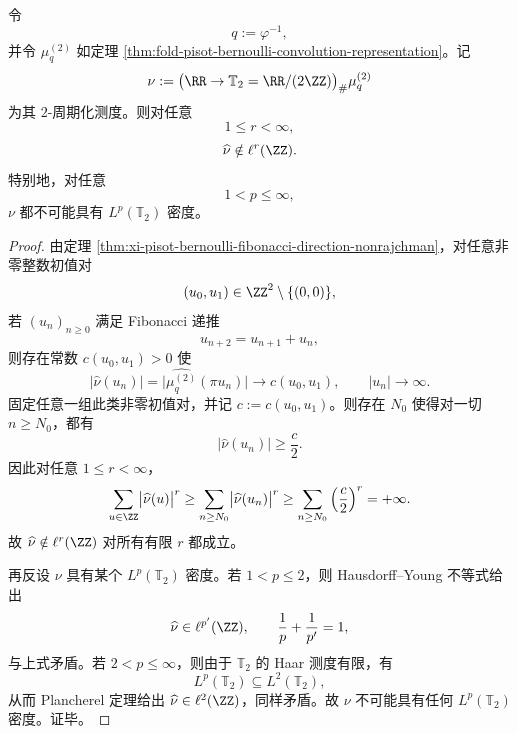 \begin{theorem}\label{thm:xi-bernoulli-two-periodization-no-lp-density}
令
\[
q:=\varphi^{-1},
\]
并令 \(\mu_q^{(2)}\) 如定理 \ref{thm:fold-pisot-bernoulli-convolution-representation}。记
\[
\nu:=\bigl(\RR\to \mathbb T_2=\RR/(2\ZZ)\bigr)_\#\mu_q^{(2)}
\]
为其 \(2\)-周期化测度。则对任意
\[
1\le r<\infty,
\]
\[
\widehat\nu\notin \ell^r(\ZZ).
\]
特别地，对任意
\[
1<p\le\infty,
\]
\(\nu\) 都不可能具有 \(L^p(\mathbb T_2)\) 密度。
\end{theorem}
\begin{proof}
由定理 \ref{thm:xi-pisot-bernoulli-fibonacci-direction-nonrajchman}，对任意非零整数初值对
\[
(u_0,u_1)\in\ZZ^2\setminus\{(0,0)\},
\]
若 \((u_n)_{n\ge 0}\) 满足 Fibonacci 递推
\[
u_{n+2}=u_{n+1}+u_n,
\]
则存在常数 \(c(u_0,u_1)>0\) 使
\[
\bigl|\widehat\nu(u_n)\bigr|
=
\bigl|\widehat{\mu_q^{(2)}}(\pi u_n)\bigr|
\longrightarrow c(u_0,u_1),
\qquad
|u_n|\to\infty.
\]
固定任意一组此类非零初值对，并记 \(c:=c(u_0,u_1)\)。则存在 \(N_0\) 使得对一切 \(n\ge N_0\)，都有
\[
\bigl|\widehat\nu(u_n)\bigr|\ge \frac{c}{2}.
\]
因此对任意 \(1\le r<\infty\)，
\[
\sum_{u\in\ZZ}\bigl|\widehat\nu(u)\bigr|^r
\ge
\sum_{n\ge N_0}\bigl|\widehat\nu(u_n)\bigr|^r
\ge
\sum_{n\ge N_0}\left(\frac{c}{2}\right)^r
=+\infty.
\]
故 \(\widehat\nu\notin \ell^r(\ZZ)\) 对所有有限 \(r\) 都成立。

再反设 \(\nu\) 具有某个 \(L^p(\mathbb T_2)\) 密度。若 \(1<p\le 2\)，则 Hausdorff--Young 不等式给出
\[
\widehat\nu\in \ell^{p'}(\ZZ),
\qquad
\frac1p+\frac1{p'}=1,
\]
与上式矛盾。若 \(2<p\le\infty\)，则由于 \(\mathbb T_2\) 的 Haar 测度有限，有
\[
L^p(\mathbb T_2)\subseteq L^2(\mathbb T_2),
\]
从而 Plancherel 定理给出 \(\widehat\nu\in \ell^2(\ZZ)\)，同样矛盾。故 \(\nu\) 不可能具有任何 \(L^p(\mathbb T_2)\) 密度。证毕。
\end{proof}

\endinput
